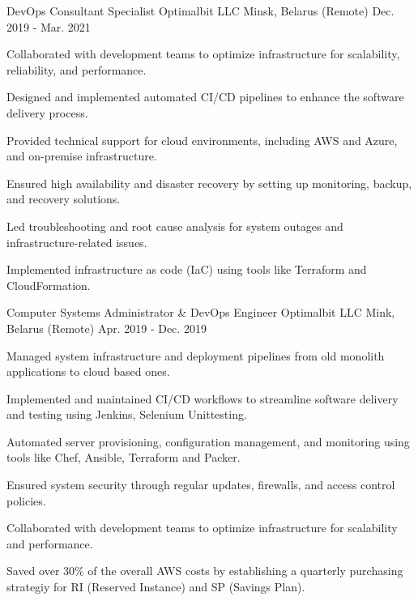 \begin{cventries}
{\begin{cvitems}
      \end{cvitems}
    }
  \cventry
    {DevOps Consultant Specialist} %
    {Optimalbit LLC} %
    {Minsk, Belarus (Remote)} %
    {Dec. 2019 - Mar. 2021} %
    {
      \begin{cvitems} %
        \item {Collaborated with development teams to optimize infrastructure for scalability, reliability, and performance.}
        \item {Designed and implemented automated CI/CD pipelines to enhance the software delivery process.}
        \item {Provided technical support for cloud environments, including AWS and Azure, and on-premise infrastructure.}
        \item {Ensured high availability and disaster recovery by setting up monitoring, backup, and recovery solutions.}
        \item {Led troubleshooting and root cause analysis for system outages and infrastructure-related issues.}
        \item {Implemented infrastructure as code (IaC) using tools like Terraform and CloudFormation.}
      \end{cvitems}
    }
  \cventry
    {Computer Systems Administrator \& DevOps Engineer} %
    {Optimalbit LLC} %
    {Mink, Belarus (Remote)} %
    {Apr. 2019 - Dec. 2019} %
    {
      \begin{cvitems} %
        \item {Managed system infrastructure and deployment pipelines from old monolith applications to cloud based ones.}
        \item {Implemented and maintained CI/CD workflows to streamline software delivery and testing using Jenkins, Selenium Unittesting.}
        \item {Automated server provisioning, configuration management, and monitoring using tools like Chef, Ansible, Terraform and Packer.}
        \item {Ensured system security through regular updates, firewalls, and access control policies.}
        \item {Collaborated with development teams to optimize infrastructure for scalability and performance.}
        \item {Saved over 30\% of the overall AWS costs by establishing a quarterly purchasing strategiy for RI (Reserved Instance) and SP (Savings Plan).}

\end{cvitems}}
\end{cventries}
